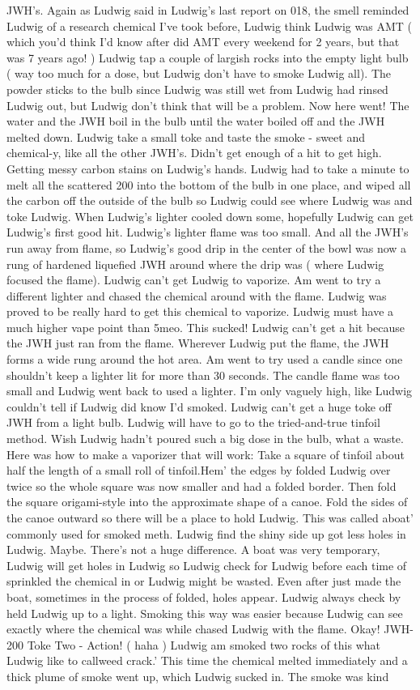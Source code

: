 \documentclass[12pt]{book}
\begin{document}
JWH's. Again as Ludwig said in Ludwig's last report on 018, the smell reminded Ludwig of a research chemical I've took before, Ludwig think Ludwig was AMT ( which you'd think I'd know after did AMT every weekend for 2 years, but that was 7 years ago! ) Ludwig tap a couple of largish rocks into the empty light bulb ( way too much for a dose, but Ludwig don't have to smoke Ludwig all). The powder sticks to the bulb since Ludwig was still wet from Ludwig had rinsed Ludwig out, but Ludwig don't think that will be a problem. Now here went! The water and the JWH boil in the bulb until the water boiled off and the JWH melted down. Ludwig take a small toke and taste the smoke - sweet and chemical-y, like all the other JWH's. Didn't get enough of a hit to get high. Getting messy carbon stains on Ludwig's hands. Ludwig had to take a minute to melt all the scattered 200 into the bottom of the bulb in one place, and wiped all the carbon off the outside of the bulb so Ludwig could see where Ludwig was and toke Ludwig. When Ludwig's lighter cooled down some, hopefully Ludwig can get Ludwig's first good hit. Ludwig's lighter flame was too small. And all the JWH's run away from flame, so Ludwig's good drip in the center of the bowl was now a rung of hardened liquefied JWH around where the drip was ( where Ludwig focused the flame). Ludwig can't get Ludwig to vaporize. Am went to try a different lighter and chased the chemical around with the flame. Ludwig was proved to be really hard to get this chemical to vaporize. Ludwig must have a much higher vape point than 5meo. This sucked! Ludwig can't get a hit because the JWH just ran from the flame. Wherever Ludwig put the flame, the JWH forms a wide rung around the hot area. Am went to try used a candle since one shouldn't keep a lighter lit for more than 30 seconds. The candle flame was too small and Ludwig went back to used a lighter. I'm only vaguely high, like Ludwig couldn't tell if Ludwig did know I'd smoked. Ludwig can't get a huge toke off JWH from a light bulb. Ludwig will have to go to the tried-and-true tinfoil method. Wish Ludwig hadn't poured such a big dose in the bulb, what a waste. Here was how to make a vaporizer that will work: Take a square of tinfoil about half the length of a small roll of tinfoil.Hem' the edges by folded Ludwig over twice so the whole square was now smaller and had a folded border. Then fold the square origami-style into the approximate shape of a canoe. Fold the sides of the canoe outward so there will be a place to hold Ludwig. This was called aboat' commonly used for smoked meth. Ludwig find the shiny side up got less holes in Ludwig. Maybe. There's not a huge difference. A boat was very temporary, Ludwig will get holes in Ludwig so Ludwig check for Ludwig before each time of sprinkled the chemical in or Ludwig might be wasted. Even after just made the boat, sometimes in the process of folded, holes appear. Ludwig always check by held Ludwig up to a light. Smoking this way was easier because Ludwig can see exactly where the chemical was while chased Ludwig with the flame. Okay! JWH-200 Toke Two - Action! ( haha ) Ludwig am smoked two rocks of this what Ludwig like to callweed crack.' This time the chemical melted immediately and a thick plume of smoke went up, which Ludwig sucked in. The smoke was kind 
\end{document}
